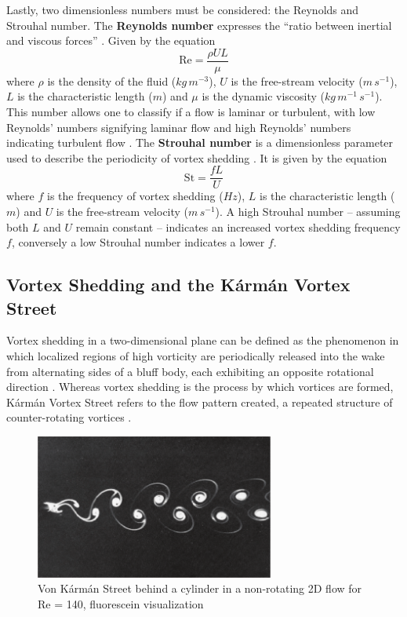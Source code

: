 Lastly, two dimensionless numbers must be considered: the Reynolds and Strouhal number. The \textbf{Reynolds number} expresses the “ratio between inertial and viscous forces” \parencite{nasa_reynolds}. Given by the equation 
\begin{equation}
	\mathrm{Re} = \frac{\rho U L}{\mu}
\end{equation}
where $\rho$ is the density of the fluid ($kg\,m^{-3}$), $U$ is the free-stream velocity ($m\,s^{-1}$), $L$ is the characteristic length ($m$) and $\mu$ is the dynamic viscosity ($kg\,m^{-1}\,s^{-1}$). This number allows one to classify if a flow is laminar or turbulent, with low Reynolds’ numbers signifying laminar flow and high Reynolds’ numbers indicating turbulent flow \parencite{saldana2024_reynolds}. The \textbf{Strouhal number} is a dimensionless parameter used to describe the periodicity of vortex shedding \parencite[p.~211]{choi2000strouhal}. It is given by the equation 
\begin{equation}
	\mathrm{St} = \frac{f L}{U}
\end{equation}
where $f$ is the frequency of vortex shedding ($Hz$), $L$ is the characteristic length ($m$) and $U$ is the free-stream velocity  ($m\,s^{-1}$). A high Strouhal number -- assuming both $L$ and $U$ remain constant -- indicates an increased vortex shedding frequency $f$, conversely a low Strouhal number indicates a lower $f$.


\subsection{Vortex Shedding and the Kármán Vortex Street}
Vortex shedding in a two-dimensional plane can be defined as the phenomenon in which localized regions of high vorticity are periodically released into the wake from alternating sides of a bluff body, each exhibiting an opposite rotational direction \parencite[156]{green1995fluid}. Whereas vortex shedding is the process by which vortices are formed, Kármán Vortex Street refers to the flow pattern created, a repeated structure of counter-rotating vortices \parencite[26]{govardhan2005karman}.

\begin{figure}[htbp]
	\centering
	\includegraphics[width=0.7\textwidth]{images/vonKarmanStreet.png}
	\caption{Von Kármán Street behind a cylinder in a non-rotating 2D flow for Re = 140, fluorescein visualization \parencite[144]{ilieva2017turbulence}}
	\label{fig:vonKarmanStreet}
\end{figure}
